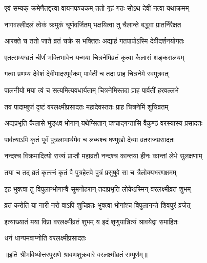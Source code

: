 \begin{center}
\twolineshloka
{एवं सम्यक् क्रमेणैतद्दत्त्वा वायनपञ्चकम्}
{ततो गृहं गतः सोऽथ देवीं नत्वा यथाक्रमम्}%


\twolineshloka
{नागवल्लीदलं त्वेकं क्रमुकं चूर्णवर्जितम्}
{भक्षयित्वा तु चैलान्ते बद्ध्वा प्रातर्निरैक्षत}%


\twolineshloka
{आरक्ते च ततो जाते व्रतं चक्रे स भक्तितः}
{अद्याहं गतपापोऽस्मि देवीदर्शनयोगतः}%


\twolineshloka
{एतत्सम्यग्व्रतं चीर्णं भक्तिभावेन यन्मया}
{चित्रनेमिव्रतं कृत्वा कैलासं शङ्करालयम्}%


\twolineshloka
{गत्वा प्रणम्य देवेशं देवीमादरपूर्वकम्}
{पार्वती च तदा प्राह चित्रनेमे स्वपुत्रवत्}%


\twolineshloka
{पालनीयो मया त्वं च सत्यमित्यवधार्यताम्}
{चित्रनेमिस्तदा प्राह पार्वतीं हरवल्लभे}%


\twolineshloka
{तव पादाम्बुजं दृष्टं वरलक्ष्मीप्रसादतः}
{महादेवस्ततः प्राह चित्रनेमिं शुचिव्रतम्}%


\twolineshloka
{अद्यप्रभृति कैलासे भुङ्क्ष्व भोगान् यथेप्सितान्}
{पश्चाद्गन्तासि वैकुण्ठं वरस्यास्य प्रसादतः}%


\twolineshloka
{पार्वत्याऽपि कृतं पूर्वं पुत्रलाभार्थमेव च}
{लब्धश्च षण्मुखो देव्या व्रतराजप्रसादतः}%


\twolineshloka
{नन्दश्च विक्रमादित्यो राज्यं प्राप्तौ महाव्रतौ}
{नन्दश्च कान्तया हीनः कान्तां लेभे सुलक्षणाम्}%


\twolineshloka
{तया च तद् व्रतं कृत्स्नं कृतं वै पुत्रहेतवे}
{पुत्रं प्रसुषुवे सा च त्रैलोक्यभरणक्षमम्}%


\twolineshloka
{इह भुक्त्वा तु विपुलान्भोगान्वै सुमनोहरान्}
{तदाप्रभृति लोकेऽस्मिन् वरलक्ष्मीव्रतं शुभम्}%


\twolineshloka
{व्रतं करोति या नारी नरो वाऽपि शुचिव्रतः}
{भुक्त्वा भोगांश्च विपुलानन्ते शिवपुरं व्रजेत्}%


\twolineshloka
{इत्याख्यातं मया विप्रा वरलक्ष्मीव्रतं शुभम्}
{य इदं शृणुयान्नित्यं श्रावयेद्वा समाहितः}%

\onelineshloka
{धनं धान्यमवाप्नोति वरलक्ष्मीप्रसादतः}%

॥इति श्रीभविष्योत्तरपुराणे श्रावणशुक्रवारे वरलक्ष्मीव्रतं सम्पूर्णम्॥

\end{center}